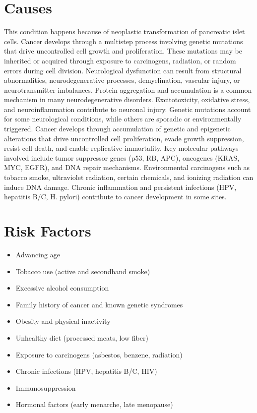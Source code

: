 \section{Causes}
This condition happens because of neoplastic transformation of pancreatic islet cells. Cancer develops through a multistep process involving genetic mutations that drive uncontrolled cell growth and proliferation. These mutations may be inherited or acquired through exposure to carcinogens, radiation, or random errors during cell division. Neurological dysfunction can result from structural abnormalities, neurodegenerative processes, demyelination, vascular injury, or neurotransmitter imbalances. Protein aggregation and accumulation is a common mechanism in many neurodegenerative disorders. Excitotoxicity, oxidative stress, and neuroinflammation contribute to neuronal injury. Genetic mutations account for some neurological conditions, while others are sporadic or environmentally triggered. Cancer develops through accumulation of genetic and epigenetic alterations that drive uncontrolled cell proliferation, evade growth suppression, resist cell death, and enable replicative immortality. Key molecular pathways involved include tumor suppressor genes (p53, RB, APC), oncogenes (KRAS, MYC, EGFR), and DNA repair mechanisms. Environmental carcinogens such as tobacco smoke, ultraviolet radiation, certain chemicals, and ionizing radiation can induce DNA damage. Chronic inflammation and persistent infections (HPV, hepatitis B/C, H. pylori) contribute to cancer development in some sites.
\section{Risk Factors}
\begin{itemize}[noitemsep]
  \item Advancing age
  \item Tobacco use (active and secondhand smoke)
  \item Excessive alcohol consumption
  \item Family history of cancer and known genetic syndromes
  \item Obesity and physical inactivity
  \item Unhealthy diet (processed meats, low fiber)
  \item Exposure to carcinogens (asbestos, benzene, radiation)
  \item Chronic infections (HPV, hepatitis B/C, HIV)
  \item Immunosuppression
  \item Hormonal factors (early menarche, late menopause)
\end{itemize}
